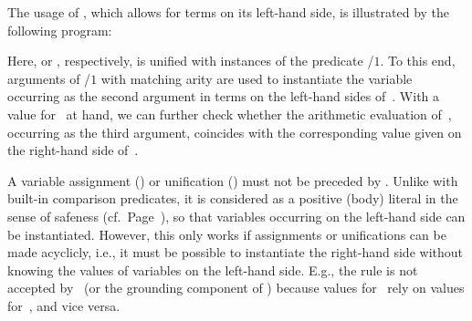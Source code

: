 \begin{example}\label{ex:unify}
The usage of \code{:=},
which allows for terms on its left-hand side,
is illustrated by the following program:
%

%
Here,  or
, respectively,
is unified with instances of the predicate /$1$.
To this end,
arguments of /$1$ with matching arity
are used to instantiate the variable~ occurring
as the second argument in terms on the left-hand sides of~\code{:=}.
With a value for~ at hand,
we can further check whether the arithmetic evaluation of~,
occurring as the third argument, coincides with the 
corresponding value given on the right-hand side of~\code{:=}.
%
\eexample
\end{example}

\begin{Note}
A variable assignment (\code{=}) or unification (\code{:=})
must not be preceded by .
Unlike with built-in comparison predicates,
it is considered as
a positive (body) literal in the sense of safeness (cf.\ Page~\pageref{pg:safe}),
so that variables occurring on the left-hand side can be instantiated.
However, this only works if assignments or unifications
can be made acyclicly, i.e.,
it must be possible to instantiate the right-hand side
without knowing the values of variables on
the left-hand side.
E.g., the rule 
is not accepted by \gringo\ (or the grounding component of \clingo)
because values for~ rely on values for~, and vice versa.
%
%
\end{Note}

